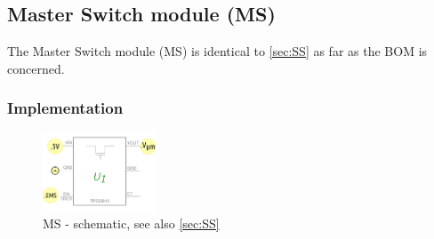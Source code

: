 
\subsection{Master Switch module (MS)}

The Master Switch module (MS) is identical to \ref{sec:SS} as far as the BOM is concerned.


\subsubsection*{Implementation}


\begin{figure}[h]
    \centering
    \includegraphics[width=0.3\textwidth]{PO/MS/MS}
    \caption{MS - schematic, see also \ref{sec:SS}}
\end{figure}






